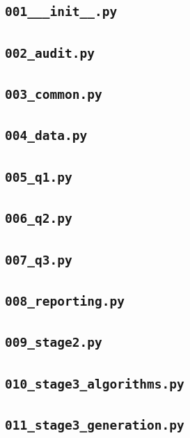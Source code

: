 \subsection*{\texttt{001\_\_\_init\_\_.py}}

\subsection*{\texttt{002\_audit.py}}

\subsection*{\texttt{003\_common.py}}

\subsection*{\texttt{004\_data.py}}

\subsection*{\texttt{005\_q1.py}}

\subsection*{\texttt{006\_q2.py}}

\subsection*{\texttt{007\_q3.py}}

\subsection*{\texttt{008\_reporting.py}}

\subsection*{\texttt{009\_stage2.py}}

\subsection*{\texttt{010\_stage3\_algorithms.py}}

\subsection*{\texttt{011\_stage3\_generation.py}}

